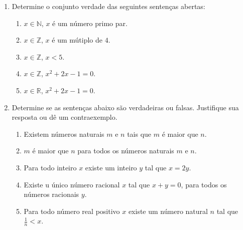 \documentclass[a4paper,5pt]{amsbook}
\newcommand{\ds}{\displaystyle}
\begin{document}
\vspace{1cm}
\begin{enumerate}
    \vspace{0.5cm}
    \item Determine o conjunto verdade das seguintes senten\c{c}as abertas:
        \begin{enumerate}
            \item $x\in\mathbb{N}$, $x$ \'e um n\'umero primo par.
            \item $x\in\mathbb{Z}$, $x$ \'e um m\'utiplo de $4$.
            \item $x\in\mathbb{Z}$, $x<5$.
            \item $x\in\mathbb{Z}$, $x^2+2x-1=0$.
            \item $x\in\mathbb{R}$, $x^2+2x-1=0$.
        \end{enumerate}


    \vspace{0.5cm}
    \item Determine se as senten\c{c}as abaixo s\~ao verdadeiras ou falsas.
    Justifique sua resposta ou d\^e um contraexemplo.
        \begin{enumerate}
            \item Existem n\'umeros naturais $m$ e $n$ tais que $m$ \'e maior que $n$.
            \item $m$ \'e maior que $n$ para todos os n\'umeros naturais $m$ e $n$.
            \item Para todo inteiro $x$ existe um inteiro $y$ tal que $x=2y$.
            \item Existe u \'unico n\'umero racional $x$ tal que $x+y=0$, para
            todos os n\'umeros racionais $y$.
            \item Para todo n\'umero real positivo $x$ existe um n\'umero natural
            $n$ tal que $\ds\frac{1}{n}<x$.
        \end{enumerate}


\end{enumerate}
\end{document}

